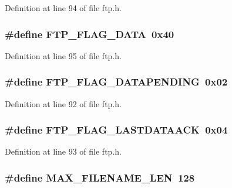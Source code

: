 Definition at line 94 of file ftp.h.

\hypertarget{group__ftp_ga929304ba787388ea46cbbd21666ab2b6}{
\subsubsection[{FTP\_\-FLAG\_\-DATA}]{\setlength{\rightskip}{0pt plus 5cm}\#define FTP\_\-FLAG\_\-DATA~0x40}}
\label{group__ftp_ga929304ba787388ea46cbbd21666ab2b6}


Definition at line 95 of file ftp.h.

\hypertarget{group__ftp_ga087d93636e55977f833c29ade04e6228}{
\subsubsection[{FTP\_\-FLAG\_\-DATAPENDING}]{\setlength{\rightskip}{0pt plus 5cm}\#define FTP\_\-FLAG\_\-DATAPENDING~0x02}}
\label{group__ftp_ga087d93636e55977f833c29ade04e6228}


Definition at line 92 of file ftp.h.

\hypertarget{group__ftp_ga8f00393bff55298d298b977325ef817a}{
\subsubsection[{FTP\_\-FLAG\_\-LASTDATAACK}]{\setlength{\rightskip}{0pt plus 5cm}\#define FTP\_\-FLAG\_\-LASTDATAACK~0x04}}
\label{group__ftp_ga8f00393bff55298d298b977325ef817a}


Definition at line 93 of file ftp.h.

\hypertarget{group__ftp_gacc9794f655f61a3246ba3fd5c9c67e14}{
\subsubsection[{MAX\_\-FILENAME\_\-LEN}]{\setlength{\rightskip}{0pt plus 5cm}\#define MAX\_\-FILENAME\_\-LEN~128}}
\label{group__ftp_gacc9794f655f61a3246ba3fd5c9c67e14}


